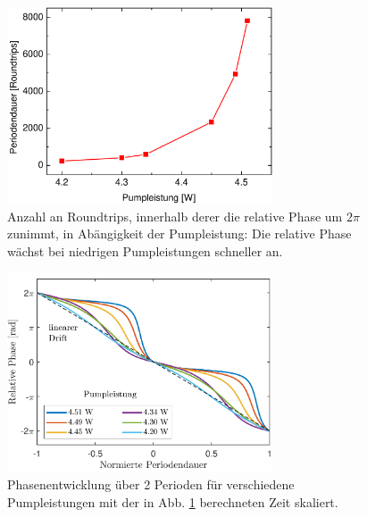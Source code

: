 \documentclass[bachelor,       %
               twoside,        %
               BCOR10mm,       %
               liststotoc,nomtotoc,bibtotoc, %
               english,ngerman, %
               final,          %
               ]{GAUBM}
\begin{document}
\begin{figure}
	\centering
	\includegraphics[width=0.7\textwidth]{figures/jumpRT.pdf}
	\caption{Anzahl an Roundtrips, innerhalb derer die relative Phase um $2\pi$ zunimmt, in Abängigkeit der Pumpleistung: Die relative Phase wächst bei niedrigen Pumpleistungen schneller an.}
   \label{fig:jumpRT}
\end{figure} 

\begin{figure}
	\centering
	\includegraphics[width=0.7\textwidth]{figures/steps_relativ4.pdf}
	\caption{Phasenentwicklung über 2 Perioden für verschiedene Pumpleistungen mit der in Abb. \ref{fig:jumpRT} berechneten Zeit skaliert.}
   \label{fig:165014steps2}
\end{figure}


%   
%   
\end{document}
